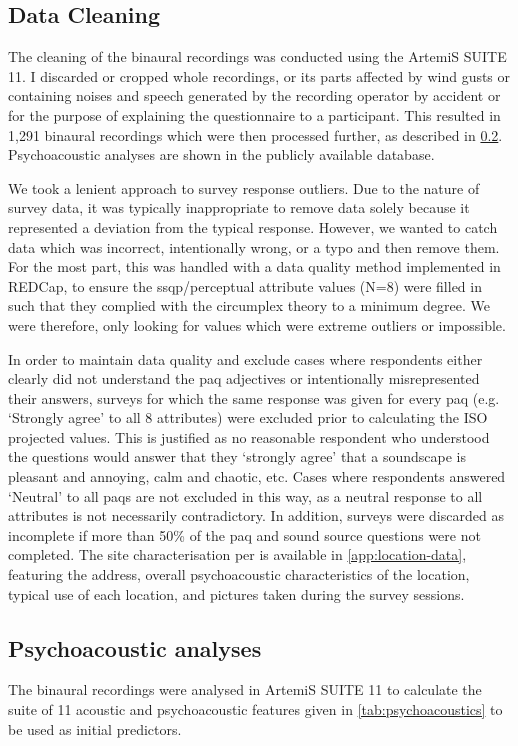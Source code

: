 \subsection{Data Cleaning}

The cleaning of the binaural recordings was conducted using the ArtemiS SUITE 11. I discarded or cropped whole recordings, or its parts affected by wind gusts or containing noises and speech generated by the recording operator by accident or for the purpose of explaining the questionnaire to a participant. This resulted in 1,291 binaural recordings which were then processed further, as described in \cref{sec:analyses}. Psychoacoustic analyses are shown in the publicly available database.

We took a lenient approach to survey response outliers. Due to the nature of survey data, it was typically inappropriate to remove data solely because it represented a deviation from the typical response. However, we wanted to catch data which was incorrect, intentionally wrong, or a typo and then remove them. For the most part, this was handled with a data quality method implemented in REDCap, to ensure the \gls{ssqp}/perceptual attribute values (N=8) were filled in such that they complied with the circumplex theory to a minimum degree. We were therefore, only looking for values which were extreme outliers or impossible.

In order to maintain data quality and exclude cases where respondents either clearly did not understand the \gls{paq} adjectives or intentionally misrepresented their answers, surveys for which the same response was given for every \gls{paq} (e.g. `Strongly agree' to all 8 attributes) were excluded prior to calculating the ISO projected values. This is justified as no reasonable respondent who understood the questions would answer that they `strongly agree' that a soundscape is pleasant and annoying, calm and chaotic, etc. Cases where respondents answered `Neutral' to all \glspl{paq} are not excluded in this way, as a neutral response to all attributes is not necessarily contradictory. In addition, surveys were discarded as incomplete if more than 50\% of the \gls{paq} and sound source questions were not completed. The site characterisation per \citet{ISO12913Part2} is available in \cref{app:location-data}, featuring the address, overall psychoacoustic characteristics of the location, typical use of each location, and pictures taken during the survey sessions.

\subsection{Psychoacoustic analyses}
   \label{sec:analyses}
   The binaural recordings were analysed in ArtemiS SUITE 11 to calculate the suite of 11 acoustic and psychoacoustic features given in \cref{tab:psychoacoustics} to be used as initial predictors.

